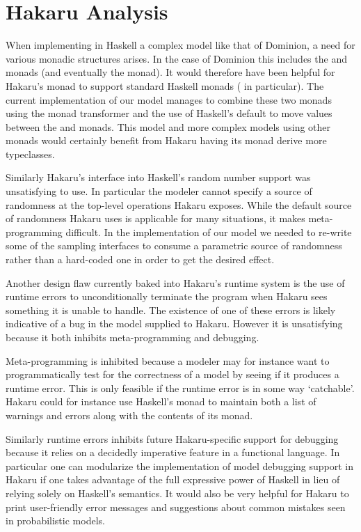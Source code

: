 \section{Hakaru Analysis} \label{sec:hakaru-analysis}

When implementing in Haskell a complex model like that of Dominion, a
need for various monadic structures arises. In the case of Dominion
this includes the  and  monads (and eventually
the  monad). It would therefore have been helpful for Hakaru's
 monad to support standard Haskell monads ( in
particular). The current implementation of our model manages to combine
these two monads using the  monad transformer and the use
of Haskell's default  to move values between the  and
 monads. This model and more complex models using other
monads would certainly benefit from Hakaru having its 
monad derive more typeclasses.

Similarly Hakaru's interface into Haskell's random number support was
unsatisfying to use. In particular the modeler cannot specify a source
of randomness at the top-level operations Hakaru exposes. While the
default source of randomness Hakaru uses is applicable for many situations,
it makes meta-programming difficult. In the implementation of our model
we needed to re-write some of the sampling interfaces to consume a parametric
source of randomness rather than a hard-coded one in order to get the
desired effect.

Another design flaw currently baked into Hakaru's runtime system is the
use of runtime errors to unconditionally terminate the program when
Hakaru sees something it is unable to handle. The existence of
one of these errors is likely indicative of a bug in the model supplied
to Hakaru. However it is unsatisfying because it both inhibits
meta-programming and debugging.

Meta-programming is inhibited because a modeler may for instance want to
programmatically test for the correctness of a model by seeing if it
produces a runtime error. This is only feasible if the runtime error
is in some way `catchable'. Hakaru could for instance use Haskell's
 monad to maintain both a list of warnings and errors
along with the contents of its  monad.

Similarly runtime errors inhibits future Hakaru-specific support for
debugging because it relies on a decidedly imperative feature in a
functional language. In particular one can modularize the implementation
of model debugging support in Hakaru if one takes advantage of the full
expressive power of Haskell in lieu of relying solely on Haskell's 
semantics. It would also be very helpful for Hakaru to print user-friendly
error messages and suggestions about common mistakes seen in probabilistic
models.

